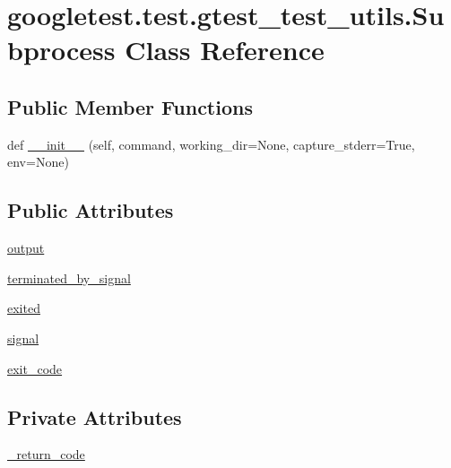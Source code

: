 \hypertarget{classgoogletest_1_1test_1_1gtest__test__utils_1_1_subprocess}{}\section{googletest.\+test.\+gtest\+\_\+test\+\_\+utils.\+Subprocess Class Reference}
\label{classgoogletest_1_1test_1_1gtest__test__utils_1_1_subprocess}
\subsection*{Public Member Functions}
\begin{DoxyCompactItemize}
\item 
def \mbox{\hyperlink{classgoogletest_1_1test_1_1gtest__test__utils_1_1_subprocess_a54393b7e39e3a24bf87b563310d837bf}{\+\_\+\+\_\+init\+\_\+\+\_\+}} (self, command, working\+\_\+dir=None, capture\+\_\+stderr=True, env=None)
\end{DoxyCompactItemize}
\subsection*{Public Attributes}
\begin{DoxyCompactItemize}
\item 
\mbox{\hyperlink{classgoogletest_1_1test_1_1gtest__test__utils_1_1_subprocess_a9d86d41c62d56a41be36541ac8ae183c}{output}}
\item 
\mbox{\hyperlink{classgoogletest_1_1test_1_1gtest__test__utils_1_1_subprocess_a4a7012044bb9ae16f2f67e485356496e}{terminated\+\_\+by\+\_\+signal}}
\item 
\mbox{\hyperlink{classgoogletest_1_1test_1_1gtest__test__utils_1_1_subprocess_a5f6b1798d2c19ad34dca9e855b2c118f}{exited}}
\item 
\mbox{\hyperlink{classgoogletest_1_1test_1_1gtest__test__utils_1_1_subprocess_a80e327e492193af9039ae165b7a8b7ca}{signal}}
\item 
\mbox{\hyperlink{classgoogletest_1_1test_1_1gtest__test__utils_1_1_subprocess_a69815667956e96642caceda94dcadf26}{exit\+\_\+code}}
\end{DoxyCompactItemize}
\subsection*{Private Attributes}
\begin{DoxyCompactItemize}
\item 
\mbox{\hyperlink{classgoogletest_1_1test_1_1gtest__test__utils_1_1_subprocess_a9307884959984ac8cd6b8446bf5091a5}{\+\_\+return\+\_\+code}}
\end{DoxyCompactItemize}


